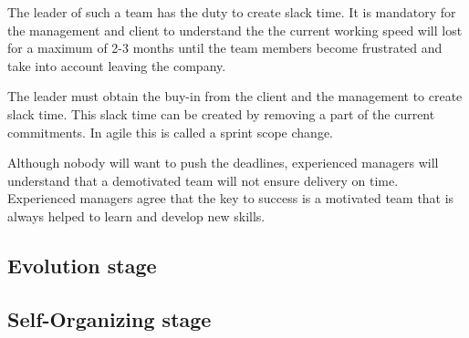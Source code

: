 The leader of such a team has the duty to create slack time. It is mandatory for the management and client to understand the the current working speed will lost for a maximum of 2-3 months until the team members become frustrated and take into account leaving the company.

The leader must obtain the buy-in from the client and the management to create slack time. This slack time can be created by removing a part of the current commitments. In agile this is called a sprint scope change.

Although nobody will want to push the deadlines, experienced managers will understand that a demotivated team will not ensure delivery on time. Experienced managers agree that the key to success is a motivated team that is always helped to learn and develop new skills.

\subsection{Evolution stage}

\subsection{Self-Organizing stage}

